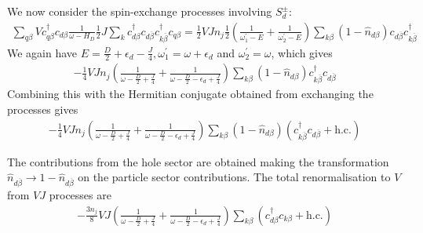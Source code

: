 We now consider the spin-exchange processes involving \(S_d^\pm\):
\begin{equation}\begin{aligned}
	\sum_{q\beta} Vc^\dagger_{q\beta} c_{d\beta} \frac{1}{\omega - H_D}\frac{1}{2}J \sum_{k} c^\dagger_{d\beta}c_{d\overline\beta} c^\dagger_{k\overline\beta}c_{q\beta} = \frac{1}{2}V J n_j \frac{1}{2}\left(\frac{1}{\omega^\prime_1 - E} + \frac{1}{\omega^\prime_2 - E}\right) \sum_{k\beta} \left(1 - \hat n_{d\beta}\right) c_{d\overline\beta}c^\dagger_{k\overline\beta}
\end{aligned}\end{equation}
We again have \(E = \frac{D}{2} + \epsilon_d - \frac{J}{4},\omega_1^\prime = \omega + \epsilon_d\) and \(\omega_2^\prime = \omega\), which gives
\begin{equation}\begin{aligned}
	-\frac{1}{4}V J n_j \left(\frac{1}{\omega - \frac{D}{2} + \frac{J}{4}} + \frac{1}{\omega - \frac{D}{2} - \epsilon_d + \frac{J}{4}}\right) \sum_{k\beta} \left(1 - \hat n_{d\beta}\right)c^\dagger_{k\overline\beta} c_{d\overline\beta}
\end{aligned}\end{equation}
Combining this with the Hermitian conjugate obtained from exchanging the processes gives
\begin{equation}\begin{aligned}
	-\frac{1}{4}V J n_j \left(\frac{1}{\omega - \frac{D}{2} + \frac{J}{4}} + \frac{1}{\omega - \frac{D}{2} - \epsilon_d + \frac{J}{4}}\right) \sum_{k\beta} \left(1 - \hat n_{d\beta}\right)\left(c^\dagger_{k\overline\beta} c_{d\overline\beta} + \text{h.c.}\right)
\end{aligned}\end{equation}

The contributions from the hole sector are obtained making the transformation \(\hat n_{d\overline\beta} \to 1 - \hat n_{d\overline\beta}\) on the particle sector contributions. The total renormalisation to \(V\) from \(VJ\) processes are
\begin{equation}\begin{aligned}
	-\frac{3n_j}{8}V J \left(\frac{1}{\omega - \frac{D}{2} + \frac{J}{4}} + \frac{1}{\omega - \frac{D}{2} - \epsilon_d + \frac{J}{4}}\right) \sum_{k\beta}\left(c^\dagger_{d\beta} c_{k\beta} + \text{h.c.}\right)
\end{aligned}\end{equation}

